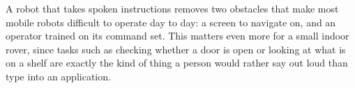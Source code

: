 %
%


%

A robot that takes spoken instructions removes two obstacles that make most mobile robots
difficult to operate day to day: a screen to navigate on, and an operator trained on its
command set. This matters even more for a small indoor rover, since tasks such as checking
whether a door is open or looking at what is on a shelf are exactly the kind of thing a person
would rather say out loud than type into an application.

